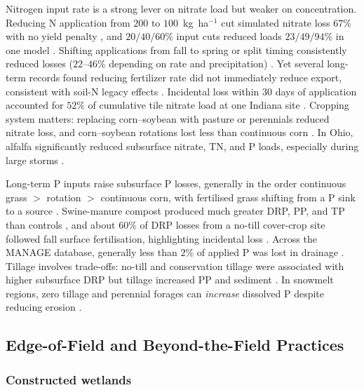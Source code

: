 \documentclass[11pt]{article}
\begin{document}
Nitrogen input rate is a strong lever on nitrate load but weaker on
concentration. Reducing N application from $200$ to $100$~kg~ha$^{-1}$ cut
simulated nitrate loss $67\%$ with no yield penalty \parencite{Moriasi2013},
and $20/40/60\%$ input cuts reduced loads $23/49/94\%$ in one model
\parencite{Chaplot2004}. Shifting applications from fall to spring or split
timing consistently reduced losses ($22$--$46\%$ depending on rate and
precipitation) \parencite{Wilson2020,Gowda2007,Nangia2010,Singh2020b}. Yet
several long-term records found reducing fertilizer rate did not immediately
reduce export, consistent with soil-N legacy effects
\parencite{Kelley2017,Cambardella1999,Siksnane2017}. Incidental loss within
$30$ days of application accounted for $52\%$ of cumulative tile nitrate load
at one Indiana site \parencite{Williams2022}. Cropping system matters:
replacing corn--soybean with pasture or perennials reduced nitrate loss, and
corn--soybean rotations lost less than continuous corn
\parencite{Chaplot2004,Ni2020,Arrueta2022}. In Ohio, alfalfa significantly
reduced subsurface nitrate, TN, and P loads, especially during large storms
\parencite{Arrueta2022,Arrueta2025}.

Long-term P inputs raise subsurface P losses, generally in the order
continuous grass $>$ rotation $>$ continuous corn, with fertilised grass
shifting from a P sink to a source \parencite{Zhang2015b}. Swine-manure
compost produced much greater DRP, PP, and TP than controls
\parencite{Zhang2015}, and about $60\%$ of DRP losses from a no-till
cover-crop site followed fall surface fertilisation, highlighting incidental
loss \parencite{Macrae2023,Mumbi2025b}. Across the MANAGE database, generally
less than $2\%$ of applied P was lost in drainage \parencite{Christianson2016}.
Tillage involves trade-offs: no-till and conservation tillage were associated
with higher subsurface DRP but tillage increased PP and sediment
\parencite{Ni2020,Macrae2023,Koskiaho2002}. In snowmelt regions, zero tillage
and perennial forages can \emph{increase} dissolved P despite reducing erosion
\parencite{Baulch2019}.

\subsection{Edge-of-Field and Beyond-the-Field Practices}

\subsubsection{Constructed wetlands}
\end{document}
